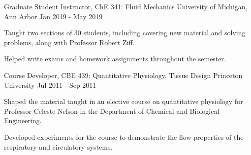 
\begin{cventries}
  \cventry
    {Graduate Student Instructor, ChE 341: Fluid Mechanics} %
    {University of Michigan, Ann Arbor} %
    {} %
    {Jan 2019 - May 2019} %
    {
      \begin{cvitems} %
        \item Taught two sections of 30 students, including covering new material and solving problems, along with Professor Robert Ziff.
        \item Helped write exams and homework assignments throughout the semester.
      \end{cvitems}
    }
  \cventry
    {Course Developer, CBE 439: Quantitative Physiology, Tissue Design} %
    {Princeton University} %
    {} %
    {Jul 2011 - Sep 2011} %
    {
      \begin{cvitems} %
        \item Shaped the material taught in an elective course on quantitative physiology for Professor Celeste Nelson in the Department of Chemical and Biological Engineering.
        \item Developed experiments for the course to demonstrate the flow properties of the respiratory and circulatory systems.
      \end{cvitems}
    }
\end{cventries}
